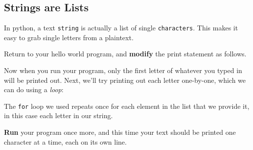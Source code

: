 	\pagebreak[2]
	\subsection*{Strings are Lists}
	
		In python, a text \texttt{string} is actually a list of single \texttt{characters}. This makes it easy to grab single letters from a plaintext.
		
		
		 Return to your hello world program, and \textbf{modify} the print statement as follows.
	
		\textbf{}
		
		Now when you run your program, only the first letter of whatever you typed in will be printed out.
		Next, we'll try printing out each letter one-by-one, which we can do using a \textit{loop}:
		
		\textbf{}
		
		The \texttt{for} loop we used repeats once for each element in the list that we provide it, in this case each letter in our string.
		
		\textbf{Run} your program once more, and this time your text should be printed one character at a time, each on its own line.
		